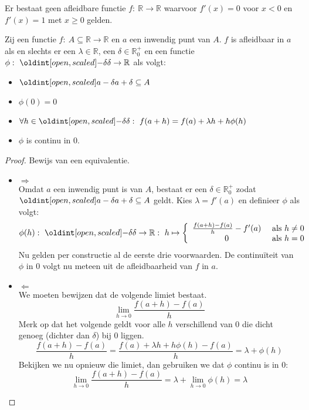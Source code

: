 \documentclass[main.tex]{subfiles}
\begin{document}
\begin{tvb}
   Er bestaat geen afleidbare functie $f:\ \mathbb{R} \rightarrow \mathbb{R}$ waarvoor $f'(x)=0$ voor $x<0$ en $f'(x)=1$ met $x \ge 0$ gelden.

\end{tvb}

\begin{st}
  Zij een functie $f:\ A \subseteq \mathbb{R} \rightarrow \mathbb{R}$ en $a$ een inwendig punt van $A$.
  $f$ is afleidbaar in $a$ als en slechts er een $\lambda \in \mathbb{R}$, een $\delta \in \mathbb{R}_{0}^{+}$ en een functie $\phi:\ \interval[open]{-\delta}{\delta} \rightarrow \mathbb{R}$ als volgt:
  \begin{itemize}
  \item $\interval[open]{a-\delta}{a+\delta}\subseteq A$
  \item $\phi(0) = 0$
  \item $\forall h \in \interval[open]{-\delta}{\delta}:\ f(a+h) = f(a) + \lambda h + h\phi(h)$ 
  \item $\phi$ is continu in $0$.
  \end{itemize}

  \begin{proof}
    Bewijs van een equivalentie.
    \begin{itemize}
    \item $\Rightarrow$\\
      Omdat $a$ een inwendig punt is van $A$, bestaat er een $\delta \in \mathbb{R}_{0}^{+}$ zodat $\interval[open]{a-\delta}{a+\delta}\subseteq A$ geldt.
      Kies $\lambda = f'(a)$ en definieer $\phi$ als volgt:
      \[ \phi(h):\ \interval[open]{-\delta}{\delta} \rightarrow \mathbb{R}:\ h \mapsto 
      \left\{
      \begin{array}{cl}
        \frac{f(a+h)-f(a)}{h}-f'(a) & \text{ als } h \neq 0\\
        0 & \text{ als } h = 0\\
      \end{array}
      \right.
      \]
      Nu gelden per constructie al de eerste drie voorwaarden.
      De continu\"iteit van $\phi$ in $0$ volgt nu meteen uit de afleidbaarheid van $f$ in $a$.
    \item $\Leftarrow$\\
      We moeten bewijzen dat de volgende limiet bestaat.
      \[ \lim_{h \rightarrow 0}\frac{f(a+h)-f(a)}{h} \]
      Merk op dat het volgende geldt voor alle $h$ verschillend van $0$ die dicht genoeg (dichter dan $\delta$) bij $0$ liggen. 
      \[ \frac{f(a+h)-f(a)}{h} = \frac{f(a) + \lambda h + h\phi(h)-f(a)}{h} = \lambda + \phi(h)\]
      Bekijken we nu opnieuw die limiet, dan gebruiken we dat $\phi$ continu is in $0$:
      \[ \lim_{h \rightarrow 0}\frac{f(a+h)-f(a)}{h} =\lambda + \lim_{h \rightarrow 0}\phi(h) = \lambda \]
    \end{itemize}
  \end{proof}
\end{st}
\end{document}
